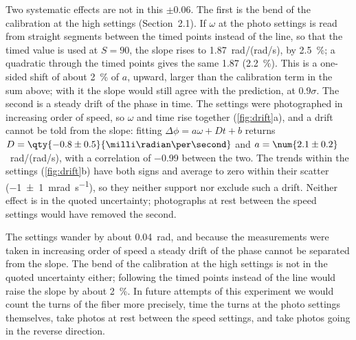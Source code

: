 Two systematic effects are not in this $\pm 0.06$. The first is the bend of the calibration at the high settings (Section~2.1). If $\omega$ at the photo settings is read from straight segments between the timed points instead of the line, so that the timed value is used at $S = 90$, the slope rises to \num{1.87}~rad/(rad/s), by \qty{2.5}{\percent}; a quadratic through the timed points gives the same \num{1.87} (\qty{2.2}{\percent}). This is a one-sided shift of about \qty{2}{\percent} of $a$, upward, larger than the calibration term in the sum above; with it the slope would still agree with the prediction, at $0.9\sigma$. The second is a steady drift of the phase in time. The settings were photographed in increasing order of speed, so $\omega$ and time rise together (\cref{fig:drift}a), and a drift cannot be told from the slope: fitting $\Delta\phi = a\omega + Dt + b$ returns $D = \qty{-0.8 \pm 0.5}{\milli\radian\per\second}$ and $a = \num{2.1 \pm 0.2}$~rad/(rad/s), with a correlation of \num{-0.99} between the two. The trends within the settings (\cref{fig:drift}b) have both signs and average to zero within their scatter (\qty{-1 \pm 1}{\milli\radian\per\second}), so they neither support nor exclude such a drift. Neither effect is in the quoted uncertainty; photographs at rest between the speed settings would have removed the second.


The settings wander by about \qty{0.04}{\radian}, and because the measurements were taken in increasing order of speed a steady drift of the phase cannot be separated from the slope. The bend of the calibration at the high settings is not in the quoted uncertainty either; following the timed points instead of the line would raise the slope by about \qty{2}{\percent}. In future attempts of this experiment we would count the turns of the fiber more precisely, time the turns at the photo settings themselves, take photos at rest between the speed settings, and take photos going in the reverse direction.



